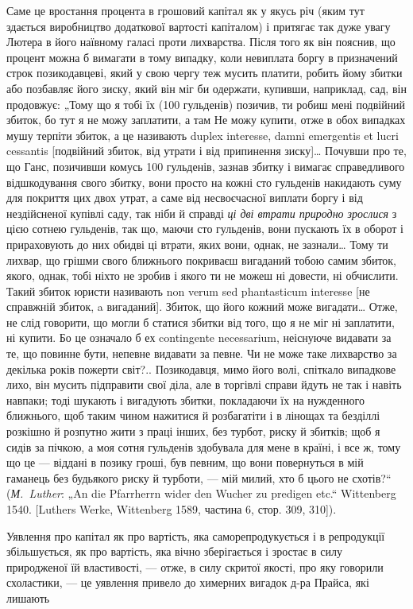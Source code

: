 
Саме це вростання процента в грошовий капітал як у якусь
річ (яким тут здається виробництво додаткової вартості капіталом)
і притягає так дуже увагу Лютера в його наївному
галасі проти лихварства. Після того як він пояснив, що
процент можна б вимагати в тому випадку, коли невиплата
боргу в призначений строк позикодавцеві, який у свою чергу
теж мусить платити, робить йому збитки або позбавляє його
зиску, який він міг би одержати, купивши, наприклад, сад,
він продовжує: „Тому що я тобі їх (100 гульденів) позичив, ти
робиш мені подвійний збиток, бо тут я не можу заплатити,
а там Не можу купити, отже в обох випадках мушу терпіти
збиток, а це називають duplex interesse, damni emergentis et
lucri cessantis [подвійний збиток, від утрати і від припинення
зиску]\dots{} Почувши про те, що Ганс, позичивши комусь
100 гульденів, зазнав збитку і вимагає справедливого відшкодування
свого збитку, вони просто на кожні сто гульденів накидають
суму для покриття цих двох утрат, а саме від несвоєчасної
виплати боргу і від нездійсненої купівлі саду, так ніби
й справді \emph{ці дві втрати природно зрослися} з цією сотнею гульденів,
так що, маючи сто гульденів, вони пускають їх в оборот
і прираховують до них обидві ці втрати, яких вони, однак, не
зазнали\dots{} Тому ти лихвар, що грішми свого ближнього покриваєш
вигаданий тобою самим збиток, якого, однак, тобі ніхто
не зробив і якого ти не можеш ні довести, ні обчислити. Такий
збиток юристи називають non verum sed phantasticum interesse [не
справжній збиток, a вигаданий]. Збиток, що його кожний може вигадати\dots{}
Отже, не слід говорити, що могли б статися збитки від
того, що я не міг ні заплатити, ні купити. Бо це означало б ех
contingente necessarium, неіснуюче видавати за те, що повинне
бути, непевне видавати за певне. Чи не може таке лихварство за
декілька років пожерти світ?.. Позикодавця, мимо його волі, спіткало
випадкове лихо, він мусить підправити свої діла, але в торгівлі
справи йдуть не так і навіть навпаки; тоді шукають і вигадують
збитки, покладаючи їх на нужденного ближнього, щоб таким
чином нажитися й розбагатіти і в лінощах та безділлі розкішно
й розпутно жити з праці інших, без турбот, риску й збитків;
щоб я сидів за пічкою, а моя сотня гульденів здобувала для
мене в країні, і все ж, тому що це — віддані в позику гроші, був
певним, що вони повернуться в мій гаманець без будьякого
риску й турботи, — мій милий, хто б цього не схотів?“ (\emph{М.~Luther}:
„An die Pfarrherrn wider den Wucher zu predigen etc.“ Wittenberg
1540. [Luthers Werke, Wittenberg 1589, частина 6, стор. 309,
310]).

Уявлення про капітал як про вартість, яка саморепродукується
і в репродукції збільшується, як про вартість, яка вічно
зберігається і зростає в силу природженої їй властивості, —
отже, в силу скритої якості, про яку говорили схоластики, — це
уявлення привело до химерних вигадок д-ра Прайса, які лишають
\parbreak{}  %
